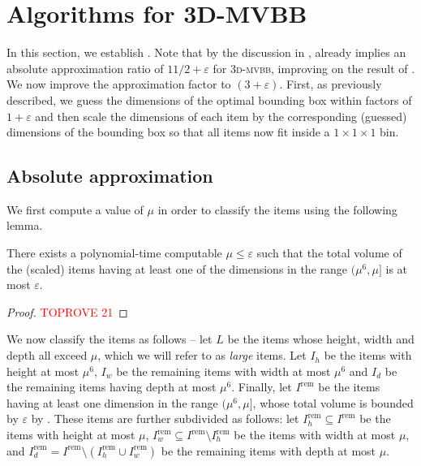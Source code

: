 \documentclass[a4paper,UKenglish,cleveref, autoref, thm-restate]{lipics-v2021}
\newcommand{\eps}{\varepsilon}
\newcommand{\tmvc}{\textsc{3d-mvbb}\xspace}
\begin{document}
\section{Algorithms for 3D-MVBB}
\label{sec:minvolumecontainer}

In this section, we establish . Note that by the discussion in ,  already implies an absolute approximation ratio of $11/2+\eps$ for \tmvc, improving on the result of \cite{li-cheng}. We now improve the approximation factor to $(3+\varepsilon)$. First, as previously described, we guess the dimensions of the optimal bounding box within factors of $1+\varepsilon$ and then scale the dimensions of each item by the corresponding (guessed) dimensions of the bounding box so that all items now fit inside a $1\times 1 \times 1$ bin. 

\subsection{Absolute approximation} 
We first compute a value of $\mu$ in order to classify the items using the following lemma.

\begin{lemma}
\label{lem:mediumitems}
     There exists a polynomial-time computable $\mu \le \varepsilon$ such that the total volume of the (scaled) items having at least one of the dimensions in the range $(\mu^6,\mu]$ is at most $\varepsilon$.
\end{lemma}
\begin{proof}\textcolor{red}{TOPROVE 21}\end{proof}

We now classify the items as follows -- let $L$ be the items whose height, width and depth all exceed $\mu$, which we will refer to as \emph{large} items. Let $I_h$ be the items with height at most $\mu^6$, $I_w$ be the remaining items with width at most $\mu^6$ and $I_d$ be the remaining items having depth at most $\mu^6$. Finally, let $I^{\text{rem}}$ be the items having at least one dimension in the range $(\mu^6,\mu]$, whose total volume is bounded by $\varepsilon$ by . These items are further subdivided as follows: let $I^{\text{rem}}_h \subseteq I^{\text{rem}}$ be the items with height at most $\mu$, $I^{\text{rem}}_w \subseteq I^{\text{rem}} \setminus I^{\text{rem}}_h$ be the items with width at most $\mu$, and $I^{\text{rem}}_d = I^{\text{rem}}\setminus (I^{\text{rem}}_h \cup I^{\text{rem}}_w)$ be the remaining items with depth at most $\mu$.
\end{document}
